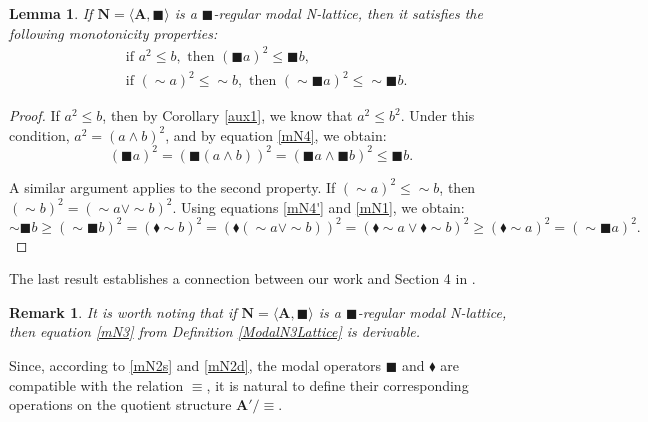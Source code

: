 \documentclass[pdflatex,sn-mathphys-num]{sn-jnl}%
\newtheorem{lemma}{Lemma}
\newcommand{\A}{\mathbf{A}}
\theoremstyle{thmstyleone}%
\theoremstyle{thmstyletwo}%
\newtheorem{remark}{Remark}%
\theoremstyle{thmstylethree}%
\begin{document}
 \begin{lemma} \label{monotonicity_RMN}
 If $\mathbf{N}=\langle \A,\blacksquare\rangle$ is a $\blacksquare$-regular modal N-lattice, then it satisfies the following monotonicity properties:
 \begin{align}
     &\text{if } a^2\leq b, \text{ then } (\blacksquare a)^2\leq \blacksquare b, \tag{mN6} \label{mN6} \\
     &\text{if } (\sim a)^2\leq \sim b, \text{ then } (\sim \blacksquare a)^2\leq \sim \blacksquare b. \tag{mN7} \label{mN7}
 \end{align}
 \end{lemma}
 \begin{proof}
 If $a^2\leq b$, then by Corollary \ref{aux1}, we know that $a^2\leq b^2$. Under this condition, $a^2 = (a\wedge b)^2$, and by equation \eqref{mN4}, we obtain:
 \[
 (\blacksquare a)^2 = (\blacksquare (a \wedge b))^2 = (\blacksquare a \wedge \blacksquare b)^2 \leq \blacksquare b.
 \]

 A similar argument applies to the second property. If $(\sim a)^2\leq \sim b$, then $(\sim b)^2 = (\sim a \vee \sim b)^2$. Using equations \eqref{mN4'} and \eqref{mN1}, we obtain:
 \[
 \sim \blacksquare b \geq (\sim \blacksquare b)^2 = (\blacklozenge \sim b)^2 = (\blacklozenge (\sim a \vee \sim b))^2 =  (\blacklozenge \sim a \vee \blacklozenge \sim b)^2 \geq (\blacklozenge \sim a)^2 = (\sim\blacksquare a ) ^2.
 \]
 \end{proof}
The last result establishes a connection between our work and Section 4 in \cite{JanRivi2014}.
 \begin{remark}
 It is worth noting that if $\mathbf{N}=\langle \A,\blacksquare\rangle$ is a $\blacksquare$-regular modal N-lattice, then equation \eqref{mN3} from Definition \ref{ModalN3Lattice} is derivable.  
 \end{remark}

 Since, according to \eqref{mN2s} and \eqref{mN2d}, the modal operators $\blacksquare$ and $\blacklozenge$ are compatible with the relation $\equiv$, it is natural to define their corresponding operations on the quotient structure $\A' / \equiv$. 

\end{document}
